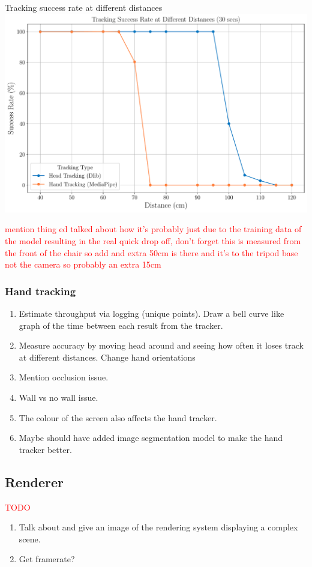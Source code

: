 \begin{figureBox}[label={fig:track-distance}, width=1.0\linewidth]{Tracking success rate at different distances}
	\includegraphics[width = 1.0\linewidth]{./evaluation/figures/tracking-success-rate.pdf}
\end{figureBox}

\textcolor{red}{mention thing ed talked about how it's probably just due to the training data of the model resulting in the real quick drop off, don't forget this is measured from the front of the chair so add and extra 50cm is there and it's to the tripod base not the camera so probably an extra 15cm}

\subsubsection{Hand tracking}
\begin{enumerate}
	\item Estimate throughput via logging (unique points). Draw a bell curve like graph of the time between each result from the tracker.
	\item Measure accuracy by moving head around and seeing how often it loses track at different distances. Change hand orientations
	\item Mention occlusion issue. 
	\item Wall vs no wall issue. 
	\item The colour of the screen also affects the hand tracker. 
	\item Maybe should have added image segmentation model to make the hand tracker better.
\end{enumerate}

\subsection{Renderer}
\textcolor{red}{TODO}
\begin{enumerate}
	\item Talk about and give an image of the rendering system displaying a complex scene.
	\item Get framerate?
\end{enumerate}

